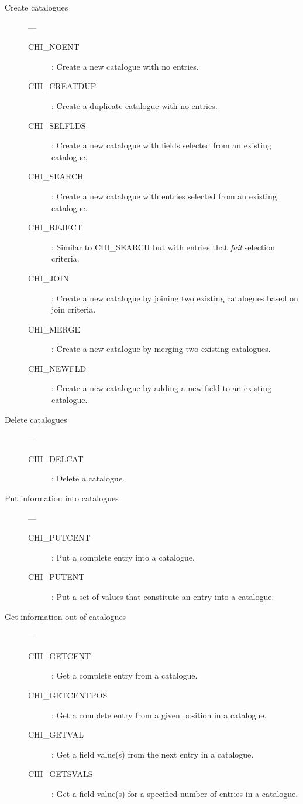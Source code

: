 \begin{description}
\item [Create catalogues] ---

\begin{description}
\item [CHI\_NOENT] : Create a new catalogue with no entries.
\item [CHI\_CREATDUP] : Create a duplicate catalogue with no entries.
\item [CHI\_SELFLDS] : Create a new catalogue with fields selected from an existing catalogue.
\item [CHI\_SEARCH] : Create a new catalogue with entries selected from an existing catalogue.
\item [CHI\_REJECT] : Similar to CHI\_SEARCH but with entries that {\em fail} selection criteria.
\item [CHI\_JOIN] : Create a new catalogue by joining two existing catalogues based on join criteria.
\item [CHI\_MERGE] : Create a new catalogue by merging two existing catalogues.
\item [CHI\_NEWFLD] : Create a new catalogue by adding a new field to an existing catalogue.
\end{description}

\item [Delete catalogues] ---

\begin{description}
\item [CHI\_DELCAT] : Delete a catalogue.
\end{description}

\item [Put information into catalogues] ---

\begin{description}
\item [CHI\_PUTCENT] : Put a complete entry into a catalogue.
\item [CHI\_PUTENT] :  Put a set of values that constitute an entry into a catalogue.
\end{description}

\item [Get information out of catalogues] ---

\begin{description}
\item  [CHI\_GETCENT] :  Get a complete entry from a catalogue.
\item  [CHI\_GETCENTPOS] : Get a complete entry from a given position in a catalogue.
\item  [CHI\_GETVAL] : Get a field value(s) from the next entry in a catalogue.
\item  [CHI\_GETSVALS] : Get a field value(s) for a specified number of entries in a catalogue.
\end{description}
\end{description}

